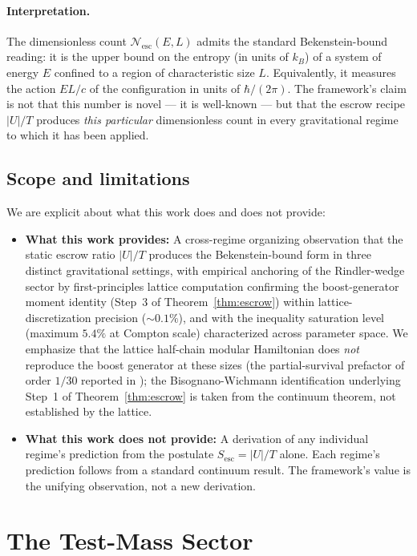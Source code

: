 \documentclass[11pt]{article}
\begin{document}
\paragraph{Interpretation.} The dimensionless count $\mathcal{N}_{\mathrm{esc}}(E, L)$ admits the standard Bekenstein-bound reading: it is the upper bound on the entropy (in units of $k_B$) of a system of energy $E$ confined to a region of characteristic size $L$. Equivalently, it measures the action $E L/c$ of the configuration in units of $\hbar/(2\pi)$. The framework's claim is not that this number is novel — it is well-known — but that the escrow recipe $|U|/T$ produces \emph{this particular} dimensionless count in every gravitational regime to which it has been applied.

\subsection{Scope and limitations}

We are explicit about what this work does and does not provide:

\begin{itemize}
\item \textbf{What this work provides:} A cross-regime organizing observation that the static escrow ratio $|U|/T$ produces the Bekenstein-bound form in three distinct gravitational settings, with empirical anchoring of the Rindler-wedge sector by first-principles lattice computation confirming the boost-generator moment identity (Step~3 of Theorem~\ref{thm:escrow}) within lattice-discretization precision ($\sim 0.1\%$), and with the inequality saturation level (maximum $5.4\%$ at Compton scale) characterized across parameter space. We emphasize that the lattice half-chain modular Hamiltonian does \emph{not} reproduce the boost generator at these sizes (the partial-survival prefactor of order $1/30$ reported in \cite{Whitmer2026Lattice}); the Bisognano-Wichmann identification underlying Step~1 of Theorem~\ref{thm:escrow} is taken from the continuum theorem, not established by the lattice.
\item \textbf{What this work does not provide:} A derivation of any individual regime's prediction from the postulate $S_{\mathrm{esc}} = |U|/T$ alone. Each regime's prediction follows from a standard continuum result. The framework's value is the unifying observation, not a new derivation.
\end{itemize}

\section{The Test-Mass Sector}
\label{sec:test_mass}
\end{document}
